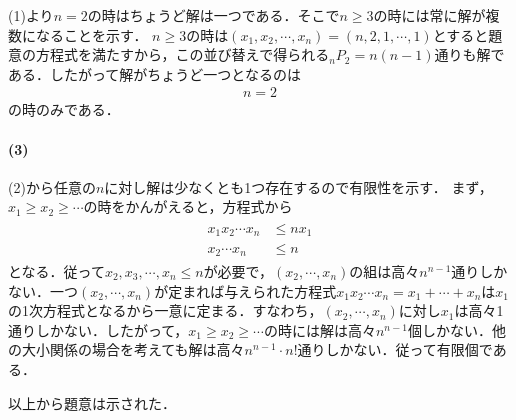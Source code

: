 \documentclass[../../main.tex]{subfiles}
\begin{document}
(1)より$n=2$の時はちょうど解は一つである．そこで$n \ge 3$の時には常に解が複数になることを示す．
$n \ge 3$の時は$(x_1,x_2,\cdots,x_n)=(n,2,1,\cdots,1)$とすると題意の方程式を満たすから，この並び替えで得られる${}_nP_2=n(n-1)$通りも解である．したがって解がちょうど一つとなるのは
\begin{align}
  n=2
\end{align}
の時のみである．

\paragraph{(3)}

(2)から任意の$n$に対し解は少なくとも1つ存在するので有限性を示す．
まず，$x_1\ge x_2\ge\cdots$の時をかんがえると，方程式から
\begin{align}
  \begin{split}
    x_1x_2\cdots x_n&\le nx_1 \\
    x_2\cdots x_n&\le n
  \end{split}
\end{align}
となる．従って$x_2,x_3,\cdots, x_n \le n$が必要で，$(x_2,\cdots,x_n)$の組は高々$n^{n-1}$通りしかない．一つ$(x_2,\cdots,x_n)$が定まれば与えられた方程式$x_1x_2\cdots x_n=x_1+\cdots+x_n$は$x_1$の1次方程式となるから一意に定まる．すなわち，$(x_2,\cdots,x_n)$に対し$x_1$は高々1通りしかない．したがって，$x_1\ge x_2\ge\cdots$の時には解は高々$n^{n-1}$個しかない．他の大小関係の場合を考えても解は高々$n^{n-1}\cdot n!$通りしかない．従って有限個である．

以上から題意は示された．

\newpage
\end{document}
